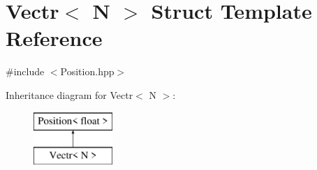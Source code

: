 \hypertarget{struct_vectr}{\section{Vectr$<$ N $>$ Struct Template Reference}
\label{struct_vectr}
}


{\ttfamily \#include $<$Position.\-hpp$>$}

Inheritance diagram for Vectr$<$ N $>$\-:\begin{figure}[H]
\begin{center}
\leavevmode
\includegraphics[height=2.000000cm]{struct_vectr}
\end{center}
\end{figure}
